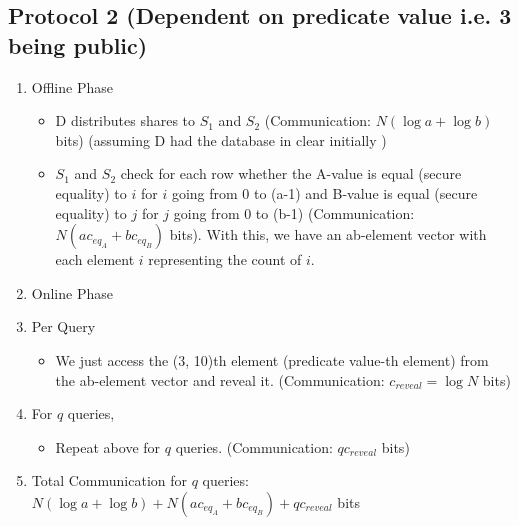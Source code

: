 \subsection{Protocol 2 (Dependent on predicate value i.e. 3 being public)}
\begin{enumerate}
    \item Offline Phase
    \begin{itemize}
        \item D distributes shares to $S_1$ and $S_2$ (Communication: $N(\log a + \log b)$ bits) (assuming D had the database in clear initially
)
        \item $S_1$ and $S_2$ check for each row whether the A-value is equal (secure equality) to $i$ for $i$ going from 0 to (a-1) and B-value is equal (secure equality) to $j$ for $j$ going from 0 to (b-1) (Communication: $N(ac_{eq_A} + bc_{eq_B})$ bits). With this, we have an ab-element vector with each element $i$ representing the count of $i$.
    \end{itemize}
    \item Online Phase
    \item Per Query
    \begin{itemize}
        \item We just access the (3, 10)th element (predicate value-th element) from the ab-element vector and reveal it. (Communication: $c_{reveal} = \log N$ bits) 
    \end{itemize}
    \item For $q$ queries,
    \begin{itemize}
        \item Repeat above for $q$ queries. (Communication: $qc_{reveal}$ bits)
    \end{itemize}
    \item Total Communication for $q$ queries: $N(\log a + \log b) + N(ac_{eq_A} + bc_{eq_B}) + qc_{reveal}$ bits  
\end{enumerate}




%

